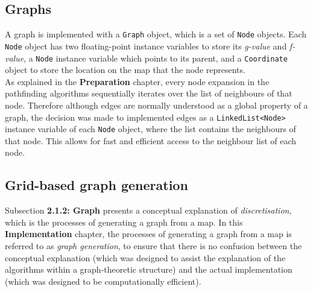 \documentclass[12pt,notitlepage]{report}
\begin{document}
\subsection{Graphs}
A graph is implemented with a {\tt Graph} object, which is a set of {\tt Node} objects. Each {\tt Node} object has two floating-point instance variables to store its {\em g-value} and {\em f-value}, a {\tt Node} instance variable which points to its parent, and a {\tt Coordinate} object to store the location on the map that the node represents.\\

\noindent
As explained in the {\bfseries Preparation} chapter, every node expansion in the pathfinding algorithms sequentially iterates over the list of neighbours of that node. Therefore although edges are normally understood as a global property of a graph, the decision was made to implemented edges as a {\tt LinkedList<Node>} instance variable of each {\tt Node} object, where the list contains the neighbours of that node. This allows for fast and efficient access to the neighbour list of each node.\\

\subsection{Grid-based graph generation}
Subsection {\bfseries 2.1.2: Graph} presents a conceptual explanation of {\em discretisation}, which is the processes of generating a graph from a map. In this {\bfseries Implementation} chapter, the processes of generating a graph from a map is referred to as {\em graph generation}, to ensure that there is no confusion between the conceptual explanation (which was designed to assist the explanation of the algorithms within a graph-theoretic structure) and the actual implementation (which was designed to be computationally efficient). \\
\end{document}
